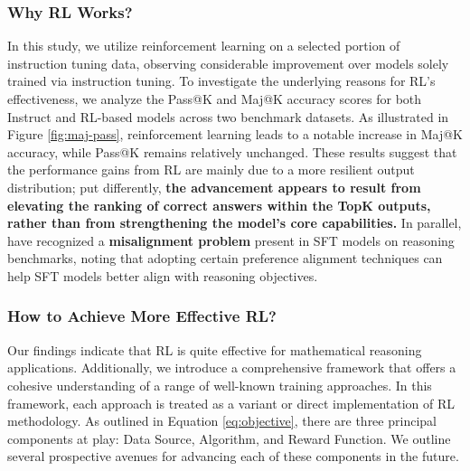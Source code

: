 \begin{itemize}[topsep=0pt]
\begin{itemize}[topsep=0pt]
\subsubsection{Why RL Works?} In this study, we utilize reinforcement learning on a selected portion of instruction tuning data, observing considerable improvement over models solely trained via instruction tuning. To investigate the underlying reasons for RL’s effectiveness, we analyze the Pass@K and Maj@K accuracy scores for both Instruct and RL-based models across two benchmark datasets. As illustrated in Figure \ref{fig:maj-pass}, reinforcement learning leads to a notable increase in Maj@K accuracy, while Pass@K remains relatively unchanged. These results suggest that the performance gains from RL are mainly due to a more resilient output distribution; put differently, \textbf{the advancement appears to result from elevating the ranking of correct answers within the TopK outputs, rather than from strengthening the model's core capabilities.} In parallel, \citep{wang2023making} have recognized a \textbf{misalignment problem} present in SFT models on reasoning benchmarks, noting that adopting certain preference alignment techniques \citep{yuan2023rrhf,song2023preference,wang2023making} can help SFT models better align with reasoning objectives.

\subsubsection{How to Achieve More Effective RL?}
\label{sec:effec_rl}
Our findings indicate that RL is quite effective for mathematical reasoning applications. Additionally, we introduce a comprehensive framework that offers a cohesive understanding of a range of well-known training approaches. In this framework, each approach is treated as a variant or direct implementation of RL methodology. As outlined in Equation \ref{eq:objective}, there are three principal components at play: Data Source, Algorithm, and Reward Function. We outline several prospective avenues for advancing each of these components in the future.


\end{itemize}
\end{itemize}
